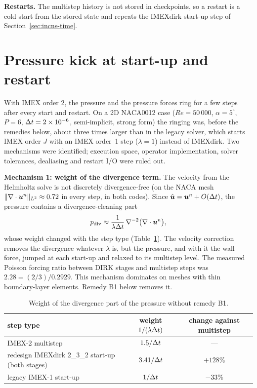 \textbf{Restarts.} The multistep history is not stored in checkpoints, so a
restart is a cold start from the stored state and repeats the IMEXdirk
start-up step of Section~\ref{sec:incns-time}.

\section{Pressure kick at start-up and restart}
\label{sec:incns-kick}

With IMEX order 2, the pressure and the pressure forces ring for a few steps
after every start and restart. On a 2D NACA0012 case ($Re=50\,000$,
$\alpha=5^\circ$, $P=6$, $\Delta t=2\times10^{-6}$, semi-implicit, strong
form) the ringing was, before the remedies below, about three times larger
than in the legacy solver, which starts IMEX order $J$ with an IMEX order~1
step ($\lambda=1$) instead of IMEXdirk. Two mechanisms were identified;
execution space, operator implementation, solver tolerances, dealiasing and
restart I/O were ruled out.

\textbf{Mechanism 1: weight of the divergence term.} The velocity from
the Helmholtz solve is not discretely divergence-free (on the NACA mesh
$\|\nabla\cdot\boldsymbol{u}^n\|_{L^2}\approx0.72$ in every step, in both codes).
Since $\hat{\boldsymbol{u}}=\boldsymbol{u}^n+O(\Delta t)$, the pressure contains a
divergence-cleaning part
\begin{equation}
  p_{\mathrm{div}}\approx\frac{1}{\lambda\Delta t}\,
  \nabla^{-2}\bigl(\nabla\cdot\boldsymbol{u}^n\bigr),
  \label{eq:incns-pdiv}
\end{equation}
whose weight changed with the step type
(Table~\ref{tab:incns-kick-weight}). The velocity correction removes the
divergence whatever $\lambda$ is, but the pressure, and with it the wall
force, jumped at each start-up and relaxed to its multistep level. The
measured Poisson forcing ratio between DIRK stages and multistep steps was
$2.28=(2/3)/0.2929$. This mechanism dominates on meshes with thin
boundary-layer elements. Remedy B1 below removes it.

\begin{table}[htbp]
\centering
\small
\begin{tabular}{@{}lcc@{}}
\toprule
step type & weight $1/(\lambda\Delta t)$ & change against multistep \\
\midrule
IMEX-2 multistep & $1.5/\Delta t$ & --- \\
redesign IMEXdirk 2\_3\_2 start-up (both stages) & $3.41/\Delta t$ & $+128\%$ \\
legacy IMEX-1 start-up & $1/\Delta t$ & $-33\%$ \\
\bottomrule
\end{tabular}
\caption{Weight of the divergence part of the pressure without remedy B1.}
\label{tab:incns-kick-weight}
\end{table}

